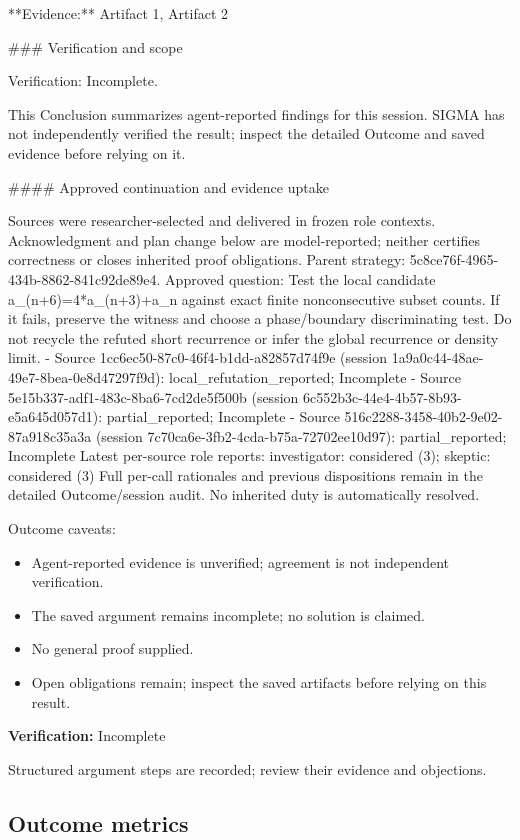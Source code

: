 \documentclass[11pt]{article}
\begin{document}
**Evidence:** Artifact 1, Artifact 2

\#\#\# Verification and scope

Verification: Incomplete.

This Conclusion summarizes agent-reported findings for this session. SIGMA has not independently verified the result; inspect the detailed Outcome and saved evidence before relying on it.

\#\#\#\# Approved continuation and evidence uptake

Sources were researcher-selected and delivered in frozen role contexts. Acknowledgment and plan change below are model-reported; neither certifies correctness or closes inherited proof obligations.
Parent strategy: 5c8ce76f-4965-434b-8862-841c92de89e4. Approved question: Test the local candidate a\_(n+6)=4*a\_(n+3)+a\_n against exact finite nonconsecutive subset counts. If it fails, preserve the witness and choose a phase/boundary discriminating test. Do not recycle the refuted short recurrence or infer the global recurrence or density limit.
- Source 1cc6ec50-87c0-46f4-b1dd-a82857d74f9e (session 1a9a0c44-48ae-49e7-8bea-0e8d47297f9d): local\_refutation\_reported; Incomplete
- Source 5e15b337-adf1-483c-8ba6-7cd2de5f500b (session 6c552b3c-44e4-4b57-8b93-e5a645d057d1): partial\_reported; Incomplete
- Source 516c2288-3458-40b2-9e02-87a918c35a3a (session 7c70ca6e-3fb2-4cda-b75a-72702ee10d97): partial\_reported; Incomplete
Latest per-source role reports: investigator: considered (3); skeptic: considered (3)
Full per-call rationales and previous dispositions remain in the detailed Outcome/session audit. No inherited duty is automatically resolved.\par
Outcome caveats:\par
\begin{itemize}
\item Agent-reported evidence is unverified; agreement is not independent verification.
\item The saved argument remains incomplete; no solution is claimed.
\item No general proof supplied.
\item Open obligations remain; inspect the saved artifacts before relying on this result.
\end{itemize}
\textbf{Verification:} Incomplete\par
Structured argument steps are recorded; review their evidence and objections.\par
\subsection{Outcome metrics}
\end{document}
